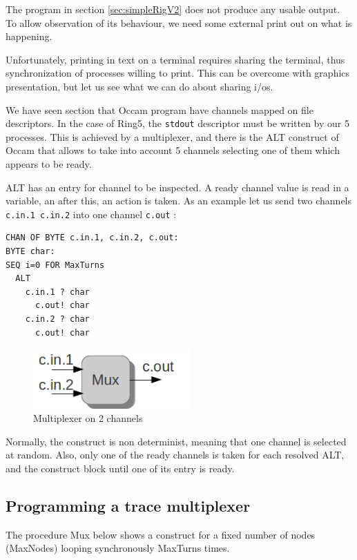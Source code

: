 \documentclass[times,a4paper]{book}
\begin{document}
The program in section \ref{sec:simpleRigV2} does not produce any
usable output. To allow observation of its behaviour, we need 
some external print out on what is happening.

Unfortunately, printing in text on a terminal requires sharing the terminal,
thus synchronization of processes willing to print. This can be overcome 
with graphics presentation, but let us see what we can do about sharing i/os.

We have seen section  that Occam program have channels mapped on
file descriptors. In the case of Ring5, the {\tt stdout} descriptor must be
written by our 5 processes. This is achieved by a multiplexer, and there
is the ALT construct of Occam that allows to take into account 5 channels
selecting one of them which appears to be ready.

ALT has an entry for channel to be inspected. A ready channel value
is read in a variable, an after this, an action is taken.
As an example let us send two channels {\tt c.in.1 c.in.2} into one channel
 {\tt c.out} :


\begin{lstlisting} 
CHAN OF BYTE c.in.1, c.in.2, c.out:
BYTE char:
SEQ i=0 FOR MaxTurns
  ALT
    c.in.1 ? char
      c.out! char
    c.in.2 ? char
      c.out! char
\end{lstlisting} 


\begin{figure}[hbtp]
\begin{center} 
\includegraphics[width=6cm]{mux2.png}
\caption{Multiplexer on 2 channels
}
\label{fig:mux2}
\end{center}
\end{figure}

Normally, the construct is non determinist, meaning that one channel
is selected at random. Also, only one of the ready channels is taken
for each resolved ALT, and the construct block until one of its entry is ready.


\subsection {Programming a trace multiplexer }
\label{sec:ring5mux}
The procedure Mux below shows a construct for 
a fixed number of nodes (MaxNodes) looping
synchronously MaxTurns times.
\end{document}

